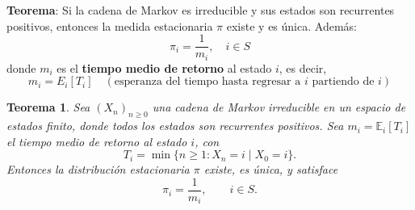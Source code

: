 \documentclass[12pt,a4paper]{article}
\newtheorem{theorem}{Teorema}
\newcommand{\teorema}[1]{%
\begin{teoremabox}
\textbf{Teorema}: #1
\end{teoremabox}
}
\begin{document}
\teorema{Si la cadena de Markov es irreducible y sus estados son recurrentes positivos, entonces la medida estacionaria $\pi$ existe y es única. Además:
\begin{equation*}
\pi_i = \frac{1}{m_i}, \quad i \in S
\end{equation*}
donde $m_i$ es el \textbf{tiempo medio de retorno} al estado $i$, es decir,
\begin{equation*}
m_i = E_i[T_i] \quad (\text{esperanza del tiempo hasta regresar a $i$ partiendo de $i$})
\end{equation*}
}

\begin{theorem}
Sea $(X_n)_{n\geq 0}$ una cadena de Markov irreducible en un espacio de estados finito,
donde todos los estados son recurrentes positivos.  
Sea $m_i = \mathbb{E}_i[T_i]$ el tiempo medio de retorno al estado $i$, con
\[
T_i = \min\{ n \geq 1 : X_n = i \mid X_0 = i \}.
\]
Entonces la distribución estacionaria $\pi$ existe, es única, y satisface
\[
\pi_i = \frac{1}{m_i}, \qquad i \in S.
\]
\end{theorem}
\end{document}
